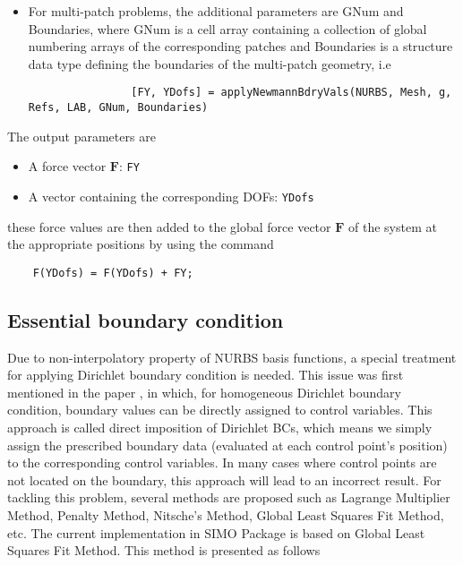 \begin{itemize}
\begin{itemize}
            \begin{lstlisting}
                [FY, YDofs] = applyNewmannBdryVals(NURBS, Mesh, g, Refs, LAB, GNum)
            \end{lstlisting}
            \begin{figure}[H]
                \centering
                \normalsize
                
                \caption{An annular patch.}
                \label{fig:Ch3SurfAnnular}
            \end{figure}
        \item  For multi-patch problems, the additional parameters are GNum and Boundaries, where GNum is a cell array containing a collection of global numbering arrays of the corresponding patches and Boundaries is a structure data type defining the boundaries of the multi-patch geometry, i.e
            \begin{lstlisting}
                [FY, YDofs] = applyNewmannBdryVals(NURBS, Mesh, g, Refs, LAB, GNum, Boundaries)
            \end{lstlisting}
    \end{itemize}
\end{itemize}
The output parameters are
\begin{itemize}
    \item A force vector $\mathbf{F}$: \lstinline{FY}
    \item A vector containing the corresponding DOFs: \lstinline{YDofs}
\end{itemize}
these force values are then added to the global force vector $\mathbf{F}$ of the system at the appropriate positions by using the command
\begin{lstlisting}
    F(YDofs) = F(YDofs) + FY;
\end{lstlisting}
\subsection{Essential boundary condition}
Due to non-interpolatory property of NURBS basis functions, a special treatment for applying Dirichlet boundary condition is needed. This issue was first mentioned in the paper \cite{Hughes20054135}, in which, for homogeneous Dirichlet boundary condition, boundary values can be directly assigned to control variables. This approach is called direct imposition of Dirichlet BCs, which means we simply assign the prescribed boundary data (evaluated at each control point's position) to the corresponding control variables. In many cases where control points are not located on the boundary, this approach will lead to an incorrect result. For tackling this problem, several methods are proposed such as Lagrange Multiplier Method, Penalty Method, Nitsche's Method, Global Least Squares Fit Method, etc. The current implementation in SIMO Package is based on Global Least Squares Fit Method. This method is presented as follows

